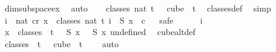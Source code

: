 \begin{isabellebody}
\ dim{}{\isacharunderscore}{\kern0pt}subspace{\isacharunderscore}{\kern0pt}ex\ \isamarkupfalse%
\ auto\isanewline
\ \ \isamarkupfalse%
\ {\isachardoublequoteopen}classes\ {\isacharparenleft}{\kern0pt}{}{\isacharcolon}{\kern0pt}{\isacharcolon}{\kern0pt}nat{\isacharparenright}{\kern0pt}\ t\ {}\ {\isacharequal}{\kern0pt}\ cube\ {}\ {\isacharparenleft}{\kern0pt}t{\isacharplus}{\kern0pt}{}{\isacharparenright}{\kern0pt}{\isachardoublequoteclose}\ \isamarkupfalse%
\ classes{\isacharunderscore}{\kern0pt}def\ \isamarkupfalse%
\ simp\isanewline
\ \ \isamarkupfalse%
\ \isamarkupfalse%
\ {\isachardoublequoteopen}{\isacharparenleft}{\kern0pt}{\isasymforall}i\ {\isasymin}\ {\isacharbraceleft}{\kern0pt}{\isachardot}{\kern0pt}{\isachardot}{\kern0pt}{}{\isacharcolon}{\kern0pt}{\isacharcolon}{\kern0pt}nat{\isacharbraceright}{\kern0pt}{\isachardot}{\kern0pt}\ {\isasymexists}c{\isacharless}{\kern0pt}r{\isachardot}{\kern0pt}\ {\isasymforall}x\ {\isasymin}\ classes\ {\isacharparenleft}{\kern0pt}{}{\isacharcolon}{\kern0pt}{\isacharcolon}{\kern0pt}nat{\isacharparenright}{\kern0pt}\ t\ i{\isachardot}{\kern0pt}\ {\isasymchi}\ {\isacharparenleft}{\kern0pt}S\ x{\isacharparenright}{\kern0pt}\ {\isacharequal}{\kern0pt}\ c{\isacharparenright}{\kern0pt}{\isachardoublequoteclose}\isanewline
\ \ \isamarkupfalse%
{\isacharparenleft}{\kern0pt}safe{\isacharparenright}{\kern0pt}\isanewline
\ \ \ \ \isamarkupfalse%
\ i\isanewline
\ \ \ \ \isamarkupfalse%
\ {\isachardoublequoteopen}{\isasymforall}x\ {\isasymin}\ classes\ {}\ t\ {}{\isachardot}{\kern0pt}\ {\isasymchi}\ {\isacharparenleft}{\kern0pt}S\ x{\isacharparenright}{\kern0pt}\ {\isacharequal}{\kern0pt}\ {\isasymchi}\ {\isacharparenleft}{\kern0pt}S\ {\isacharparenleft}{\kern0pt}{\isasymlambda}x{\isachardot}{\kern0pt}\ undefined{\isacharparenright}{\kern0pt}{\isacharparenright}{\kern0pt}{\isachardoublequoteclose}\ \isamarkupfalse%
\ cube{}{\isacharunderscore}{\kern0pt}alt{\isacharunderscore}{\kern0pt}def\ \isanewline
\ \ \ \ \ \ \isamarkupfalse%
\ {\isacartoucheopen}classes\ {}\ t\ {}\ {\isacharequal}{\kern0pt}\ cube\ {}\ {\isacharparenleft}{\kern0pt}t\ {\isacharplus}{\kern0pt}\ {}{\isacharparenright}{\kern0pt}{\isacartoucheclose}\ \isamarkupfalse%
\ auto\isanewline
\ \ \ \ \isamarkupfalse%

\end{isabellebody}

